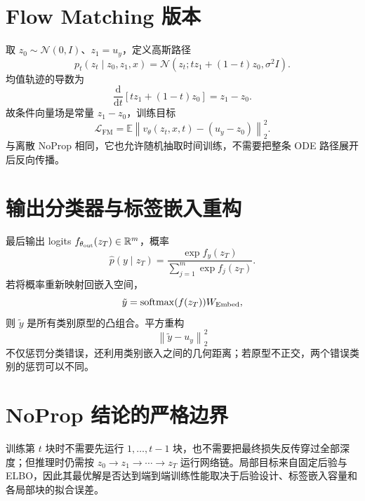 \documentclass[UTF8,12pt,a4paper,fontset=none]{ctexart}
\numberwithin{equation}{section}
\newcommand{\R}{\mathbb{R}}
\newcommand{\E}{\mathbb{E}}
\newcommand{\Loss}{\mathcal{L}}
\newcommand{\norm}[1]{\left\lVert #1\right\rVert}
\newcommand{\softmax}{\operatorname{softmax}}
\newcommand{\dd}{\mathrm{d}}
\begin{document}
\section{Flow Matching 版本}
取 $z_0\sim\mathcal N(0,I)$、$z_1=u_y$，定义高斯路径
\begin{equation}
 p_t(z_t\mid z_0,z_1,x)=\mathcal N\!\left(z_t;t z_1+(1-t)z_0,\sigma^2I\right).
\end{equation}
均值轨迹的导数为
\begin{equation}
 \frac{\dd}{\dd t}\left[t z_1+(1-t)z_0\right]=z_1-z_0.
\end{equation}
故条件向量场是常量 $z_1-z_0$，训练目标
\begin{equation}
 \boxed{\Loss_{\mathrm{FM}}=
 \E\norm{v_\theta(z_t,x,t)-(u_y-z_0)}_2^2.}
\end{equation}
与离散 NoProp 相同，它也允许随机抽取时间训练，不需要把整条 ODE 路径展开后反向传播。

\section{输出分类器与标签嵌入重构}
最后输出 logits $f_{\theta_{\rm out}}(z_T)\in\R^m$，概率
\begin{equation}
 \hat p(y\mid z_T)=\frac{\exp f_y(z_T)}{\sum_{j=1}^{m}\exp f_j(z_T)}.
\end{equation}
若将概率重新映射回嵌入空间，
\begin{equation}
 \tilde y=\softmax(f(z_T))W_{\rm Embed},
\end{equation}
则 $\tilde y$ 是所有类别原型的凸组合。平方重构
\begin{equation}
 \norm{\tilde y-u_y}_2^2
\end{equation}
不仅惩罚分类错误，还利用类别嵌入之间的几何距离；若原型不正交，两个错误类别的惩罚可以不同。

\section{NoProp 结论的严格边界}
\begin{criticalbox}
训练第 $t$ 块时不需要先运行 $1,\ldots,t-1$ 块，也不需要把最终损失反传穿过全部深度；但推理时仍需按 $z_0\to z_1\to\cdots\to z_T$ 运行网络链。局部目标来自固定后验与 ELBO，因此其最优解是否达到端到端训练性能取决于后验设计、标签嵌入容量和各局部块的拟合误差。
\end{criticalbox}
\end{document}
